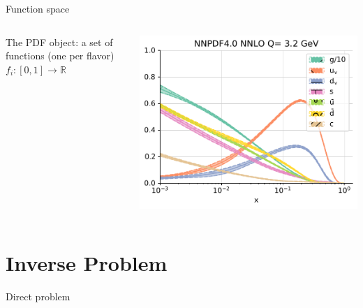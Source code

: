 \documentclass[9pt]{beamer}
\begin{document}
\begin{frame}{Function space}
    \begin{columns}
        \begin{column}{0.5\textwidth}
            The PDF object: a set of functions (one per flavor) $f_i: [0, 1] \to \mathbb{R}$
        \end{column}
        \begin{column}{0.5\textwidth}
            \begin{tcolorbox}
                \includegraphics[width=\textwidth]{pdfs_pdg_Qs0_plot_flavours}
            \end{tcolorbox}
        \end{column}
    \end{columns}
\end{frame}

\section{Inverse Problem}

\begin{frame}{Direct problem}
\end{frame}
\end{document}

